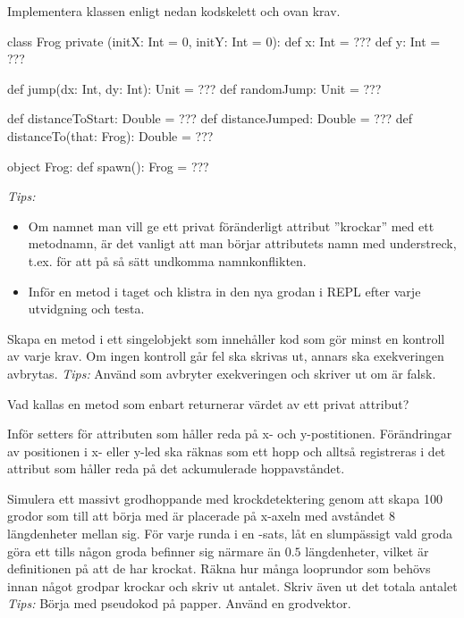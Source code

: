 \Subtask Implementera klassen  enligt nedan kodskelett och ovan krav.

\begin{Code}
class Frog private (initX: Int = 0, initY: Int = 0):
    def x: Int = ???
    def y: Int = ???

    def jump(dx: Int, dy: Int): Unit = ???
    def randomJump: Unit = ???

    def distanceToStart: Double = ???
    def distanceJumped: Double = ???
    def distanceTo(that: Frog): Double = ???

object Frog:
    def spawn(): Frog = ???
\end{Code}
\emph{Tips:}
\begin{itemize} [nolistsep, noitemsep]
\item Om namnet man vill ge ett privat föränderligt attribut ''krockar'' med ett metodnamn, är det vanligt att man börjar attributets namn med understreck, t.ex.  för att på så sätt undkomma namnkonflikten.
\item Inför en metod i taget och klistra in den nya grodan i REPL efter varje utvidgning och testa.
\end{itemize}



\Subtask Skapa en metod  i ett singelobjekt  som innehåller kod som gör minst en kontroll av varje krav. Om ingen kontroll går fel ska  skrivas ut, annars ska exekveringen avbrytas. \emph{Tips:} Använd  som avbryter exekveringen och skriver ut  om  är falsk.

\Subtask Vad kallas en metod som enbart returnerar värdet av ett privat attribut?

\Subtask Inför setters för attributen som håller reda på x- och y-postitionen. Förändringar av positionen i x- eller y-led ska räknas som ett hopp och alltså registreras i det attribut som håller reda på det ackumulerade hoppavståndet.

\Subtask Simulera ett massivt grodhoppande med krockdetektering genom att skapa 100 grodor som till att börja med är placerade på x-axeln med avståndet $8$ längdenheter mellan sig. För varje runda i en -sats, låt en slumpässigt vald groda göra ett  tills någon groda befinner sig närmare än $0.5$ längdenheter, vilket är definitionen på att de har krockat. Räkna hur många looprundor som behövs innan något grodpar krockar och skriv ut antalet. Skriv även ut det totala antalet \\ \emph{Tips:} Börja med pseudokod på papper. Använd en grodvektor.


